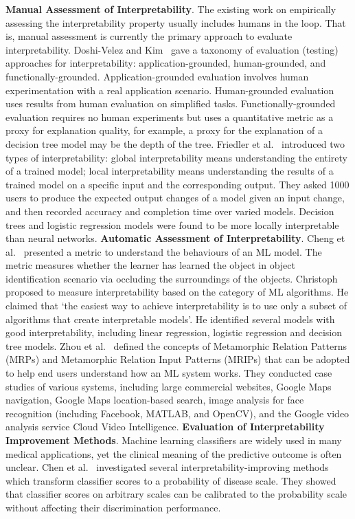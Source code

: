 \label{sec:inter}
\noindent\textbf{Manual Assessment of Interpretability}.
The existing work on empirically assessing the interpretability property usually includes humans in the loop. 
That is, manual assessment is currently the primary approach to evaluate interpretability.
Doshi-Velez and Kim~ gave a taxonomy of evaluation (testing) approaches for interpretability: application-grounded, human-grounded, and functionally-grounded.
Application-grounded evaluation involves human experimentation with a real application scenario.
Human-grounded evaluation uses results from human evaluation on simplified tasks.
Functionally-grounded evaluation requires no human experiments but uses a quantitative metric as a proxy for explanation quality, for example, a proxy for the explanation of a decision tree model may be the depth of the tree. 
Friedler et al.~ introduced two types of interpretability:
global interpretability means understanding the entirety of a trained model;
local interpretability means understanding the results of a trained model on a specific input and the corresponding output.
They asked 1000 users to produce the expected
output changes of a model given an input change, and then recorded accuracy and completion time over
varied models.
Decision trees and logistic
regression models were found to be more locally interpretable than neural networks.
\noindent\textbf{Automatic Assessment of Interpretability}.
Cheng et al.~ presented a metric to understand the behaviours of an ML model.
The metric measures whether the learner has learned the object in object identification scenario via occluding the surroundings of the objects.
Christoph~ proposed to measure interpretability based on the category of ML algorithms.
He claimed that `the easiest way to achieve interpretability is to use only a subset of algorithms that create interpretable models'. 
He identified several models with good interpretability, including
linear regression, logistic regression and decision tree models.
Zhou et al.~ defined the concepts of Metamorphic Relation Patterns (MRPs) and Metamorphic Relation Input Patterns (MRIPs) that can be adopted to help end users understand how an ML system works.
They conducted case studies of various systems, including large commercial websites, Google Maps navigation, Google Maps location-based search, image analysis for face recognition (including Facebook, MATLAB, and OpenCV), and the Google video analysis service Cloud Video Intelligence. 
\noindent\textbf{Evaluation of Interpretability Improvement Methods}.
Machine learning classifiers are widely used in many medical applications, yet the clinical meaning of the predictive outcome is often unclear.
Chen et al.~ investigated several interpretability-improving methods which transform classifier scores to a probability of disease scale. 
They showed that classifier scores on arbitrary scales can be calibrated to the probability scale without affecting their discrimination performance.

